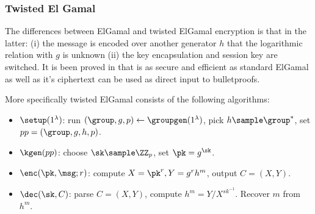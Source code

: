 \subsubsection{Twisted El Gamal}
\label{TwistedElGamal}

The differences between ElGamal and twisted ElGamal encryption is that in the latter: (i) the message is encoded over another generator $h$ that the logarithmic relation with $g$ is unknown (ii) the key encapsulation and session key are switched. It is been proved in \cite{PGC} that is as secure and efficient as standard ElGamal as well as it's ciphertext can be used as direct input to bulletproofs.

More specifically twisted ElGamal consists of the following algorithms:
\begin{itemize}
    \item $\setup(1^\lambda)$: run $(\group, g, p) \gets \groupgen(1^\lambda)$, pick $h \sample \group^*$, set $pp = (\group, g,h,p)$.
    \item $\kgen(pp)$: choose $\sk \sample \ZZ_p$, set $\pk = g^\sk$. 
    \item $\enc(\pk,\msg;r)$: compute $X = \pk^r, Y=g^r h^m$, output $C=(X,Y)$.
    \item $\dec(\sk, C)$: parse $C=(X,Y)$, compute $h^m = Y/X^{sk^{-1}}$. Recover $m$ from $h^m$. 
\end{itemize}
